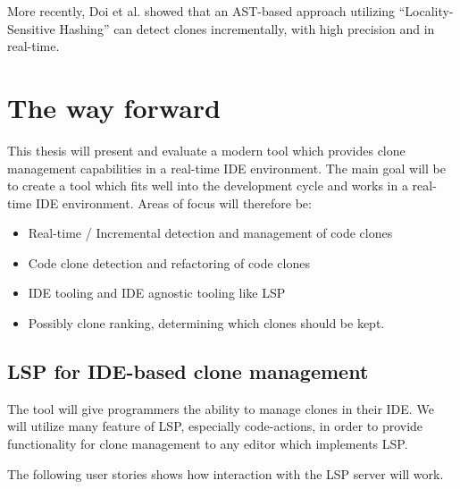 \documentclass[12pt]{article}
\begin{document}
More recently, Doi et al.\cite{TowardsScalableAndIncrementalCloneDetection} showed that an
AST-based approach utilizing ``Locality-Sensitive Hashing'' can detect clones
incrementally, with high precision and in real-time.

\section{The way forward}

This thesis will present and evaluate a modern tool which provides clone management
capabilities in a real-time IDE environment. The main goal will be to create a tool which
fits well into the development cycle and works in a real-time IDE environment. Areas of
focus will therefore be:

\begin{itemize}
	\item Real-time / Incremental detection and management of code clones
	\item Code clone detection and refactoring of code clones
	\item IDE tooling and IDE agnostic tooling like LSP
	\item Possibly clone ranking, determining which clones should be kept.
\end{itemize}

\subsection{LSP for IDE-based clone management}

The tool will give programmers the ability to manage clones in their IDE. We will utilize
many feature of LSP, especially code-actions, in order to provide functionality for clone
management to any editor which implements LSP.

The following user stories shows how interaction with the LSP server will work.
\end{document}
